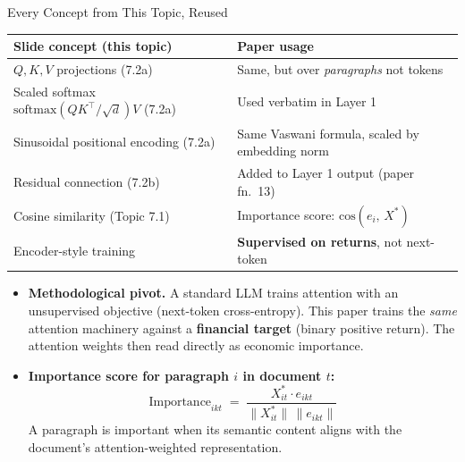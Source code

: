 \begin{frame}{Every Concept from This Topic, Reused}
\centering
\renewcommand{\arraystretch}{1.25}
\footnotesize
\begin{tabular}{l l}
\toprule
\textbf{Slide concept (this topic)} & \textbf{Paper usage} \\
\midrule
$Q, K, V$ projections (7.2a)                  & Same, but over \emph{paragraphs} not tokens \\
Scaled softmax $\mathrm{softmax}(QK^{\top}/\sqrt{d})V$ (7.2a) & Used verbatim in Layer 1 \\
Sinusoidal positional encoding (7.2a)         & Same Vaswani formula, scaled by embedding norm \\
Residual connection (7.2b)                    & Added to Layer 1 output (paper fn.\ 13) \\
Cosine similarity (Topic 7.1)                 & Importance score: $\mathrm{cos}(e_i,\, X^{*})$ \\
Encoder-style training                        & \textbf{Supervised on returns}, not next-token \\
\bottomrule
\end{tabular}

\medskip
\begin{itemize}
\item \textbf{Methodological pivot.} A standard LLM trains attention with an unsupervised objective (next-token cross-entropy). This paper trains the \emph{same} attention machinery against a \textbf{financial target} (binary positive return). The attention weights then read directly as economic importance.

\medskip
\item \textbf{Importance score for paragraph $i$ in document $t$:}
\[
   \boxed{\;\;\text{Importance}_{ikt} \;=\; \frac{X_{it}^{*} \cdot e_{ikt}}{\|X_{it}^{*}\|\,\|e_{ikt}\|}\;\;}
\]
A paragraph is important when its semantic content aligns with the document's attention-weighted representation.
\end{itemize}
\end{frame}

